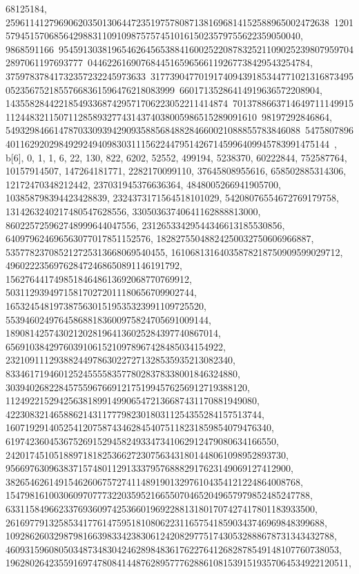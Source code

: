 {{{68125184, 2596114127969062035013064472351975780871381696814152588965002472638\
12015794515706856429883110910987575745101615023579755622359050040, 9868591166\
95459130381965462645653884160025220878325211090252398079597042897061197693777\
0446226169076844516596566119267738429543254784, 37597837841732357232245973633\
31773904770191740943918534477102131687349505235675218557668361596476218083999\
66017135286414919636572208904, 1435582844221854933687429571706223052211414874\
70137886637146497111499151124483211507112858932774314374038005986515289091610\
98197292846864, 5493298466147870330939429093588568488284660021088855783846088\
54758078964011629202984929249409830311156224479514267145996409945783991475144}\
}, {b[6], {0, 1, 1, 6, 22, 130, 822, 6202, 52552, 499194, 5238370, 60222844, 
   752587764, 10157914507, 147264181771, 2282170099110, 37645808955616, 
   658502885314306, 12172470348212442, 237031945376636364, 
   4848005266941905700, 103858798394423428839, 2324373171564518101029, 
   54208076554672769179758, 1314263240217480547628556, 
   33050363740641162888813000, 860225725962748999644047556, 
   23126533429544346613185530856, 640979624696563077017851152576, 
   18282755048824250032750606966887, 535778237085212725313668069540455, 
   16106813164035878218750909599029712, 496022235697628472468650891146191792, 
   15627644174985184648613692068770769912, 
   503112939497158170272011180656709902744, 
   16532454819738756301519535323991109725520, 
   553946024976458688183600975824705691009144, 
   18908142574302120281964136025284397740867014, 
   656910384297603910615210978967428485034154922, 
   23210911129388244978630227271328535935213082340, 
   833461719460125245555835778028378338001846324880, 
   30394026822845755967669121751994576256912719388120, 
   1124922152942563818991499065472136687431170881949080, 
   42230832146588621431177798230180311254355284157513744, 
   1607192914052541207587434628454075118231859854079476340, 
   61974236045367526915294582493347341062912479080634166550, 
   2420174510518897181825366272307563431801448061098952893730, 
   95669763096383715748011291333795768882917623149069127412900, 
   3826546261491546260675727411489190132976104354121224864008768, 
   154798161003060970777322035952166550704652049657979852485247788, 
   6331158496623376936097425366019692288131801707427417801183933500, 
   261697791325853417761475951810806223116575418590343746969848399688, 
   10928626032987981663983342383061242082977517430532888678731343432788, 
   460931596080503487348304246289848361762276412682878549148107760738053, 
   19628026423559169747808414487628957776288610815391519357064534922120511, 
}}}
